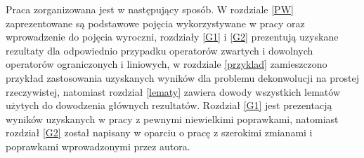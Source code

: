 \documentclass[man,mfiu]{mgrwms}
\begin{document}
\begin{wstep}
\indent Praca zorganizowana jest w następujący sposób. W rozdziale \ref{PW} zaprezentowane są podstawowe pojęcia wykorzystywane w pracy oraz wprowadzenie do pojęcia wyroczni, rozdziały \ref{G1} i \ref{G2} prezentują uzyskane rezultaty dla odpowiednio przypadku operatorów zwartych i dowolnych operatorów ograniczonych i liniowych, w rozdziale \ref{przyklad} zamieszczono przykład zastosowania uzyskanych wyników dla problemu dekonwolucji na prostej rzeczywistej, natomiast rozdział \ref{lematy} zawiera dowody wszystkich lematów użytych do dowodzenia głównych rezultatów. Rozdział \ref{G1} jest prezentacją wyników uzyskanych w pracy \cite{cavalier1} z pewnymi niewielkimi poprawkami, natomiast rozdział \ref{G2} został napisany w oparciu o pracę \cite{cavalier2} z szerokimi zmianami i poprawkami wprowadzonymi przez autora.
\end{wstep}
\end{document}
